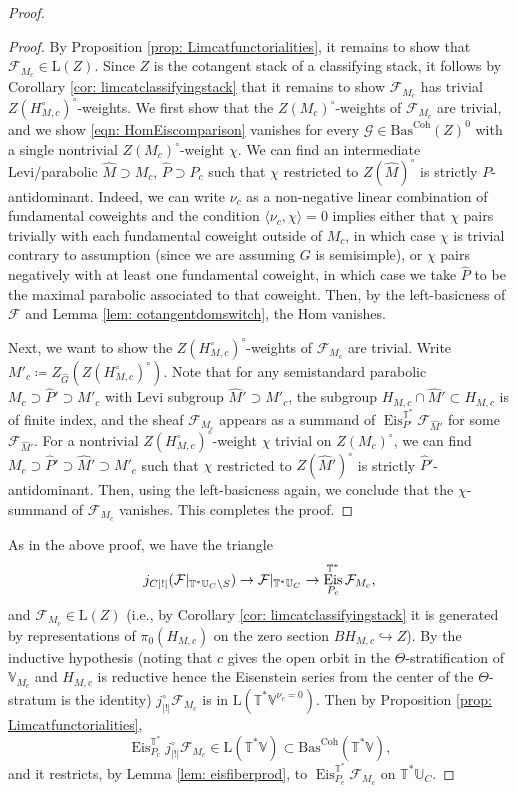 \documentclass{amsart}
\theoremstyle{definition}
\theoremstyle{remark}
\numberwithin{equation}{section}
\newcommand{\U}{\mathbb{U}}
\newcommand{\mc}{\mathcal}
\newcommand{\wh}{\widehat}
\DeclareMathOperator{\Eis}{\mathrm{Eis}}
\newcommand{\Coh}{\mathrm{Coh}}
\newcommand{\V}{\mathbb{V}}
\newcommand{\T}{\mathbb{T}}
\newcommand{\Bas}{\mathrm{Bas}}
\newcommand{\ush}{\lvert ! \rvert}
\newcommand{\mrL}{\mathrm{L}}
\begin{document}
\begin{proof}
\begin{proof}
By Proposition \ref{prop: Limcatfunctorialities}, it remains to show that $\mc F_{M_c}\in \mrL(Z)$. Since $Z$ is the cotangent stack of a classifying stack, it follows by Corollary \ref{cor: limcatclassifyingstack} that it remains to show $\mc F_{M_c}$ has trivial $Z(H^{\circ}_{M, c})^{\circ}$-weights. We first show that the $Z(M_c)^\circ$-weights of $\mc F_{M_c}$ are trivial, and we show \eqref{eqn: HomEiscomparison} vanishes for every $\mc G\in \Bas^\Coh(Z)^0$ with a single nontrivial $Z(M_c)^\circ$-weight $\chi$. We can find an intermediate Levi/parabolic $\wh M\supset M_c$, $\wh P\supset P_c$ such that $\chi$ restricted to $Z(\wh M)^\circ$ is strictly $P$-antidominant. Indeed, we can write $\nu_c$ as a non-negative linear combination of fundamental coweights and the condition $\langle \nu_c, \chi \rangle =0$ implies either that $\chi$ pairs trivially with each fundamental coweight outside of $M_c$, in which case $\chi$ is trivial contrary to assumption (since we are assuming $G$ is semisimple), or $\chi$ pairs negatively with at least one fundamental coweight, in which case we take $
\wh{P}$ to be the maximal parabolic associated to that coweight. Then, by the left-basicness of $\mc F$ and Lemma \ref{lem: cotangentdomswitch}, the Hom vanishes. 

Next, we want to show the $Z(H_{M,c}^\circ)^\circ$-weights of $\mc F_{M_c}$ are trivial. Write $M'_c\coloneq Z_{\wh G}(Z(H_{M,c}^\circ)^\circ)$. Note that for any semistandard parabolic $M_c \supset \wh P'\supset M'_c$ with Levi subgroup $\wh{M}'\supset M'_c$, the subgroup $H_{M,c}\cap \wh{M}'\subset H_{M,c}$ is of finite index, and the sheaf $\mc F_{M_c}$ appears as a summand of $\Eis_{P'}^{\T^*}\mc F_{\wh{M}'}$ for some $\mc F_{\wh{M}'}$. For a nontrivial $Z(H_{M,c}^\circ)^\circ$-weight $\chi$ trivial on $Z(M_c)^\circ$, we can find $M_c\supset \wh{P}'\supset \wh{M}'\supset M'_c$ such that $\chi$ restricted to $Z(\wh{M}')^\circ$ is strictly $\wh{P}'$-antidominant. Then, using the left-basicness again, we conclude that the $\chi$-summand of $\mc F_{M_c}$ vanishes. This completes the proof. 
\end{proof}

As in the above proof, we have the triangle
\begin{equation}{\label{eqn: limcatfibertriangle}}
    j_{C\ush}(\mc F|_{\T^* \U_C\setminus S})\to
\mc F|_{\T^* \U_C} \to
\Eis_{P_c}^{\T^*} \mc F_{M_c},
\end{equation}
and $\mc F_{M_c}\in \mrL (Z)$ (i.e., by Corollary \ref{cor: limcatclassifyingstack} it is generated by representations of $\pi_0 (H_{M,c})$ on the zero section $BH_{M,c}\hookrightarrow Z$). By the inductive hypothesis (noting that $c$ gives the open orbit in the $\Theta$-stratification of $\V_{M_c}$ and $H_{M,c}$ is reductive hence the Eisenstein series from the center of the $\Theta$-stratum is the identity) $j^\circ_{\ush}\mc F_{M_c}$ is in $\mrL(\T^*\V^{\nu_c=0})$. Then by Proposition \ref{prop: Limcatfunctorialities}, 
\[
\Eis_{P_c}^{\T^*} j_{\ush}^\circ\mc F_{M_c} \in \mrL(\T^*\V)\subset \Bas^\Coh(\T^*\V),
\]
and it restricts, by Lemma \ref{lem: eisfiberprod}, to $\Eis_{P_c}^{\T^*} \mc F_{M_c}$ on $\T^{\ast}\U_C$. 


\end{proof}
\end{document}
